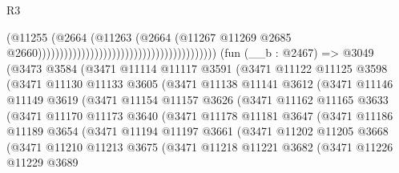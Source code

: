 \begin{lexlean}{R3}
\begin{coremodule}
                                                                            (@11255
                                                                              (@2664
                                                                                (@11263
                                                                                  (@2664
                                                                                    (@11267
                                                                                      @11269
                                                                                      @2685
                                                                                      @2660)))))))))))))))))))))))))))))))))))))))))
    (fun (__b : @2467) =>
    @3049
      (@3473
        @3584
        (@3471
          @11114
          @11117
          @3591
          (@3471
            @11122
            @11125
            @3598
            (@3471
              @11130
              @11133
              @3605
              (@3471
                @11138
                @11141
                @3612
                (@3471
                  @11146
                  @11149
                  @3619
                  (@3471
                    @11154
                    @11157
                    @3626
                    (@3471
                      @11162
                      @11165
                      @3633
                      (@3471
                        @11170
                        @11173
                        @3640
                        (@3471
                          @11178
                          @11181
                          @3647
                          (@3471
                            @11186
                            @11189
                            @3654
                            (@3471
                              @11194
                              @11197
                              @3661
                              (@3471
                                @11202
                                @11205
                                @3668
                                (@3471
                                  @11210
                                  @11213
                                  @3675
                                  (@3471
                                    @11218
                                    @11221
                                    @3682
                                    (@3471
                                      @11226
                                      @11229
                                      @3689

\end{coremodule}
\end{lexlean}
